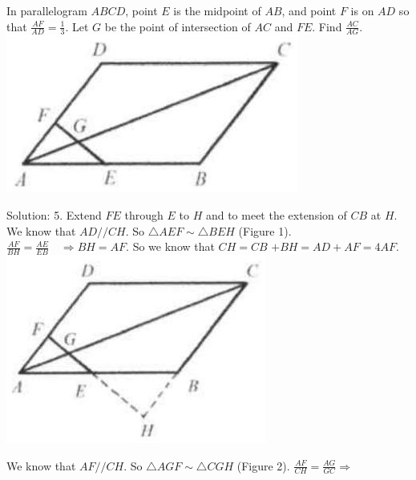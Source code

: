 \documentclass{article}
\begin{document}
In parallelogram \(A B C D\), point \(E\) is the midpoint of \(A B\), and point \(F\) is on \(A D\) so that \(\frac{A F}{A D}=\frac{1}{3}\). Let \(G\) be the point of intersection of \(A C\) and \(F E\). Find \(\frac{A C}{A G}\).\\
\centering
\includegraphics[width=\textwidth]{images/123.jpg}

Solution: 5.
Extend \(F E\) through \(E\) to \(H\) and to meet the extension of \(C B\) at \(H\).\\
We know that \(A D / / C H\). So \(\triangle A E F \sim \triangle B E H\) (Figure 1). \(\frac{A F}{B H}=\frac{A E}{E B} \quad \Rightarrow B H=A F\). So we know that \(C H=C B\) \(+B H=A D+A F=4 A F\).\\
\centering
\includegraphics[width=\textwidth]{images/123(1).jpg}

We know that \(A F / / C H\). So \(\triangle A G F \sim \triangle C G H\) (Figure 2). \(\frac{A F}{C H}=\frac{A G}{G C} \Rightarrow\)
\end{document}
